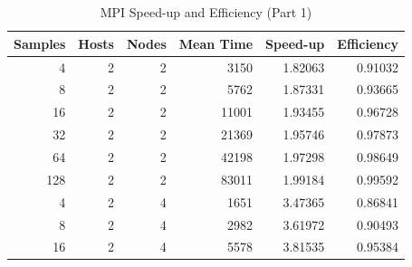 \documentclass[journal,transmag]{IEEEtran}
\begin{document}
\section{}
	\begin{table}[h]
	\centering
	\caption{MPI Speed-up and Efficiency (Part 1)}
	\label{table_mpi_data_1}
	\begin{tabular}{|r|r|r|r|r|r|}
		\hline
		\multicolumn{1}{|l|}{Samples} & \multicolumn{1}{l|}{Hosts} & \multicolumn{1}{l|}{Nodes} & \multicolumn{1}{l|}{Mean Time} & \multicolumn{1}{l|}{Speed-up} & \multicolumn{1}{l|}{Efficiency} \\ \hline
		4                             & 2                          & 2                                & 3150                           & 1.82063                       & 0.91032                         \\ \hline
		8                             & 2                          & 2                                & 5762                           & 1.87331                       & 0.93665                         \\ \hline
		16                            & 2                          & 2                                & 11001                          & 1.93455                       & 0.96728                         \\ \hline
		32                            & 2                          & 2                                & 21369                          & 1.95746                       & 0.97873                         \\ \hline
		64                            & 2                          & 2                                & 42198                          & 1.97298                       & 0.98649                         \\ \hline
		128                           & 2                          & 2                                & 83011                          & 1.99184                       & 0.99592                         \\ \hline
		4                             & 2                          & 4                                & 1651                           & 3.47365                       & 0.86841                         \\ \hline
		8                             & 2                          & 4                                & 2982                           & 3.61972                       & 0.90493                         \\ \hline
		16                            & 2                          & 4                                & 5578                           & 3.81535                       & 0.95384                         \\ \hline

\end{tabular}
\end{table}
\end{document}
